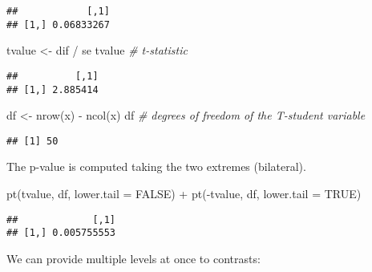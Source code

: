 \documentclass[
  oneside]{book}
\newenvironment{Shaded}{\begin{snugshade}}{\end{snugshade}}
\newcommand{\AttributeTok}[1]{\textcolor[rgb]{0.77,0.63,0.00}{#1}}
\newcommand{\CommentTok}[1]{\textcolor[rgb]{0.56,0.35,0.01}{\textit{#1}}}
\newcommand{\ConstantTok}[1]{\textcolor[rgb]{0.00,0.00,0.00}{#1}}
\newcommand{\FunctionTok}[1]{\textcolor[rgb]{0.00,0.00,0.00}{#1}}
\newcommand{\NormalTok}[1]{#1}
\newcommand{\OtherTok}[1]{\textcolor[rgb]{0.56,0.35,0.01}{#1}}
\newcommand{\SpecialCharTok}[1]{\textcolor[rgb]{0.00,0.00,0.00}{#1}}
\newcommand{\StringTok}[1]{\textcolor[rgb]{0.31,0.60,0.02}{#1}}
\begin{document}
\begin{verbatim}
##            [,1]
## [1,] 0.06833267
\end{verbatim}

\begin{Shaded}
\begin{Highlighting}[]
\NormalTok{tvalue }\OtherTok{\textless{}{-}}\NormalTok{ dif }\SpecialCharTok{/}\NormalTok{ se}
\NormalTok{tvalue }\CommentTok{\# t{-}statistic}
\end{Highlighting}
\end{Shaded}

\begin{verbatim}
##          [,1]
## [1,] 2.885414
\end{verbatim}

\begin{Shaded}
\begin{Highlighting}[]
\NormalTok{df }\OtherTok{\textless{}{-}} \FunctionTok{nrow}\NormalTok{(x) }\SpecialCharTok{{-}} \FunctionTok{ncol}\NormalTok{(x)}
\NormalTok{df }\CommentTok{\# degrees of freedom of the T{-}student variable}
\end{Highlighting}
\end{Shaded}

\begin{verbatim}
## [1] 50
\end{verbatim}

The p-value is computed taking the two extremes (bilateral).

\begin{Shaded}
\begin{Highlighting}[]
\FunctionTok{pt}\NormalTok{(tvalue, df, }\AttributeTok{lower.tail =} \ConstantTok{FALSE}\NormalTok{) }\SpecialCharTok{+} \FunctionTok{pt}\NormalTok{(}\SpecialCharTok{{-}}\NormalTok{tvalue, df, }\AttributeTok{lower.tail =} \ConstantTok{TRUE}\NormalTok{)}
\end{Highlighting}
\end{Shaded}

\begin{verbatim}
##             [,1]
## [1,] 0.005755553
\end{verbatim}

We can provide multiple levels at once to contrasts:

\begin{Shaded}
\end{Shaded}
\end{document}

